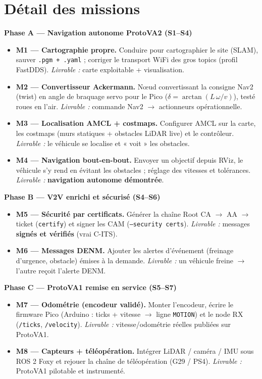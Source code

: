 \documentclass[a4paper,10pt]{article}
\begin{document}
\section*{\textcolor{primary}{Détail des missions}}

\textbf{\textcolor{cNav}{Phase A --- Navigation autonome ProtoVA2 (S1--S4)}}
\begin{itemize}[leftmargin=1.4em, itemsep=1pt]
\item \textbf{M1 --- Cartographie propre.} Conduire pour cartographier le site
      (SLAM), sauver \texttt{.pgm + .yaml} ; corriger le transport WiFi des gros
      topics (profil FastDDS). \emph{Livrable :} carte exploitable + visualisation.
\item \textbf{M2 --- Convertisseur Ackermann.} N{\oe}ud convertissant la consigne
      Nav2 (twist) en angle de braquage servo pour le Pico
      ($\delta=\arctan(L\,\omega/v)$), testé roues en l'air. \emph{Livrable :}
      commande Nav2 $\rightarrow$ actionneurs opérationnelle.
\item \textbf{M3 --- Localisation AMCL + costmaps.} Configurer AMCL sur la carte,
      les costmaps (murs statiques + obstacles LiDAR live) et le contrôleur.
      \emph{Livrable :} le véhicule se localise et « voit » les obstacles.
\item \textbf{M4 --- Navigation bout-en-bout.} Envoyer un objectif depuis RViz,
      le véhicule s'y rend en évitant les obstacles ; réglage des vitesses et
      tolérances. \emph{Livrable :} \textbf{navigation autonome démontrée}.
\end{itemize}

\textbf{\textcolor{cV2V}{Phase B --- V2V enrichi et sécurisé (S4--S6)}}
\begin{itemize}[leftmargin=1.4em, itemsep=1pt]
\item \textbf{M5 --- Sécurité par certificats.} Générer la chaîne
      Root CA $\rightarrow$ AA $\rightarrow$ ticket (\texttt{certify}) et signer
      les CAM (\texttt{--security certs}). \emph{Livrable :} messages
      \textbf{signés et vérifiés} (vrai C-ITS).
\item \textbf{M6 --- Messages DENM.} Ajouter les alertes d'événement (freinage
      d'urgence, obstacle) émises à la demande. \emph{Livrable :} un véhicule
      freine $\rightarrow$ l'autre reçoit l'alerte DENM.
\end{itemize}

\textbf{\textcolor{cP1}{Phase C --- ProtoVA1 remise en service (S5--S7)}}
\begin{itemize}[leftmargin=1.4em, itemsep=1pt]
\item \textbf{M7 --- Odométrie (encodeur validé).} Monter l'encodeur, écrire le
      firmware Pico (Arduino : ticks + vitesse $\rightarrow$ ligne \texttt{MOTION})
      et le node RX (\texttt{/ticks}, \texttt{/velocity}). \emph{Livrable :}
      vitesse/odométrie réelles publiées sur ProtoVA1.
\item \textbf{M8 --- Capteurs + téléopération.} Intégrer LiDAR / caméra / IMU
      sous ROS 2 Foxy et rejouer la chaîne de téléopération (G29 / PS4).
      \emph{Livrable :} ProtoVA1 pilotable et instrumenté.
\end{itemize}
\end{document}
